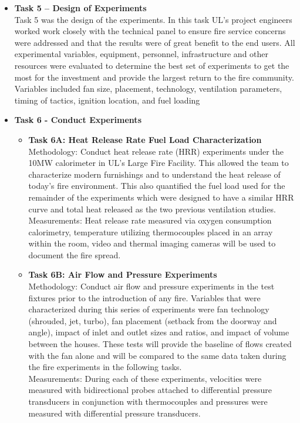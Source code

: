 \documentclass{article}
\begin{document}
\begin{itemize}
	\item \textbf{Task 5 – Design of Experiments} \\
	Task 5 was the design of the experiments. In this task UL’s project engineers worked work closely with the technical panel to ensure fire service concerns were addressed and that the results were of great benefit to the end users. All experimental variables, equipment, personnel, infrastructure and other resources were evaluated to determine the best set of experiments to get the most for the investment and provide the largest return to the fire community. Variables included fan size, placement, technology, ventilation parameters, timing of tactics, ignition location, and fuel loading
	
	\item \textbf{Task 6 - Conduct Experiments} \\
	\begin{itemize}
		\item \textbf{Task 6A: Heat Release Rate Fuel Load Characterization} \\
		Methodology: Conduct heat release rate (HRR) experiments under the 10MW calorimeter in UL’s Large Fire Facility. This allowed the team to characterize modern furnishings and to understand the heat release of today’s fire environment. This also quantified the fuel load used for the remainder of the experiments which were designed to have a similar HRR curve and total heat released as the two previous ventilation studies. \\
		\vspace{\baselineskip}
		Measurements: Heat release rate measured via oxygen consumption calorimetry, temperature utilizing thermocouples placed in an array within the room, video and thermal imaging cameras will be used to document the fire spread.
		
		\item \textbf{Task 6B: Air Flow and Pressure Experiments} \\
		Methodology: Conduct air flow and pressure experiments in the test fixtures prior to the introduction of any fire. Variables that were characterized during this series of experiments were fan technology (shrouded, jet, turbo), fan placement (setback from the doorway and angle), impact of inlet and outlet sizes and ratios, and impact of volume between the houses. These tests will provide the baseline of flows created with the fan alone and will be compared to the same data taken during the fire experiments in the following tasks.\\
		\vspace*{\baselineskip}
		Measurements: During each of these experiments, velocities were measured with bidirectional probes attached to differential pressure transducers in conjunction with thermocouples and pressures were measured with differential pressure transducers.
		

\end{itemize}
\end{itemize}
\end{document}
